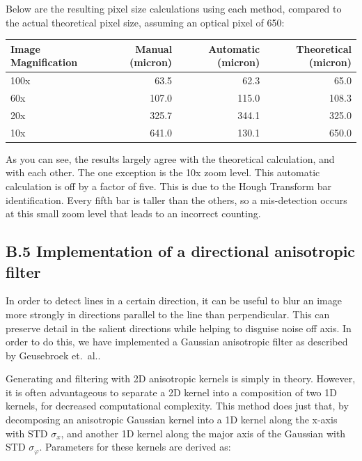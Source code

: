 \documentclass{article}
\begin{document}
Below are the resulting pixel size calculations using each method, compared to the actual theoretical pixel size, assuming an optical pixel of \unit{650}{\nano\meter}:

\begin{center}
\begin{tabular}{l | r | r | r}
     Image Magnification & Manual (micron) & Automatic (micron) & Theoretical (micron) \\
     \hline
     100x                & 63.5            & 62.3               & 65.0 \\
     60x                 & 107.0           & 115.0              & 108.3 \\
     20x                 & 325.7           & 344.1              & 325.0 \\
     10x                 & 641.0           & 130.1              & 650.0
\end{tabular}
\end{center}

As you can see, the results largely agree with the theoretical calculation, and with each other. The one exception is the 10x zoom level. This automatic calculation is off by a factor of five. This is due to the Hough Transform bar identification. Every fifth bar is taller than the others, so a mis-detection occurs at this small zoom level that leads to an incorrect counting.


\subsection*{B.5 Implementation of a directional anisotropic filter}

In order to detect lines in a certain direction, it can be useful to blur an image more strongly in directions parallel to the line than perpendicular. This can preserve detail in the salient directions while helping to disguise noise off axis. In order to do this, we have implemented a Gaussian anisotropic filter as described by Geusebroek et.\ al.\cite{geusebroek}.

Generating and filtering with 2D anisotropic kernels is simply in theory. However, it is often advantageous to separate a 2D kernel into a composition of two 1D kernels, for decreased computational complexity. This method does just that, by decomposing an anisotropic Gaussian kernel into a 1D kernel along the x-axis with STD $\sigma_x$, and another 1D kernel along the major axis of the Gaussian with STD $\sigma_\varphi$. Parameters for these kernels are derived as:
\end{document}
